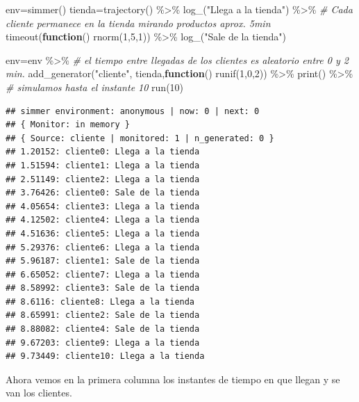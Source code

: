 \documentclass[
]{book}
\newenvironment{Shaded}{\begin{snugshade}}{\end{snugshade}}
\newcommand{\CommentTok}[1]{\textcolor[rgb]{0.56,0.35,0.01}{\textit{#1}}}
\newcommand{\ControlFlowTok}[1]{\textcolor[rgb]{0.13,0.29,0.53}{\textbf{#1}}}
\newcommand{\DecValTok}[1]{\textcolor[rgb]{0.00,0.00,0.81}{#1}}
\newcommand{\FunctionTok}[1]{\textcolor[rgb]{0.00,0.00,0.00}{#1}}
\newcommand{\NormalTok}[1]{#1}
\newcommand{\OtherTok}[1]{\textcolor[rgb]{0.56,0.35,0.01}{#1}}
\newcommand{\SpecialCharTok}[1]{\textcolor[rgb]{0.00,0.00,0.00}{#1}}
\newcommand{\StringTok}[1]{\textcolor[rgb]{0.31,0.60,0.02}{#1}}
\theoremstyle{definition}
\theoremstyle{definition}
\theoremstyle{definition}
\theoremstyle{definition}
\theoremstyle{remark}
\begin{document}
\begin{Shaded}
\begin{Highlighting}[]
\NormalTok{env}\OtherTok{=}\FunctionTok{simmer}\NormalTok{()}
\NormalTok{tienda}\OtherTok{=}\FunctionTok{trajectory}\NormalTok{() }\SpecialCharTok{\%\textgreater{}\%}
  \FunctionTok{log\_}\NormalTok{(}\StringTok{"Llega a la tienda"}\NormalTok{) }\SpecialCharTok{\%\textgreater{}\%}
  \CommentTok{\# Cada cliente permanece en la tienda mirando productos aprox. 5min}
  \FunctionTok{timeout}\NormalTok{(}\ControlFlowTok{function}\NormalTok{() }\FunctionTok{rnorm}\NormalTok{(}\DecValTok{1}\NormalTok{,}\DecValTok{5}\NormalTok{,}\DecValTok{1}\NormalTok{)) }\SpecialCharTok{\%\textgreater{}\%} 
  \FunctionTok{log\_}\NormalTok{(}\StringTok{"Sale de la tienda"}\NormalTok{)}

\NormalTok{env}\OtherTok{=}\NormalTok{env }\SpecialCharTok{\%\textgreater{}\%}
  \CommentTok{\# el tiempo entre llegadas de los clientes es aleatorio entre 0 y 2 min.}
  \FunctionTok{add\_generator}\NormalTok{(}\StringTok{"cliente"}\NormalTok{, tienda,}\ControlFlowTok{function}\NormalTok{() }\FunctionTok{runif}\NormalTok{(}\DecValTok{1}\NormalTok{,}\DecValTok{0}\NormalTok{,}\DecValTok{2}\NormalTok{)) }\SpecialCharTok{\%\textgreater{}\%} 
  \FunctionTok{print}\NormalTok{() }\SpecialCharTok{\%\textgreater{}\%}
  \CommentTok{\# simulamos hasta el instante 10}
  \FunctionTok{run}\NormalTok{(}\DecValTok{10}\NormalTok{) }
\end{Highlighting}
\end{Shaded}

\begin{verbatim}
## simmer environment: anonymous | now: 0 | next: 0
## { Monitor: in memory }
## { Source: cliente | monitored: 1 | n_generated: 0 }
## 1.20152: cliente0: Llega a la tienda
## 1.51594: cliente1: Llega a la tienda
## 2.51149: cliente2: Llega a la tienda
## 3.76426: cliente0: Sale de la tienda
## 4.05654: cliente3: Llega a la tienda
## 4.12502: cliente4: Llega a la tienda
## 4.51636: cliente5: Llega a la tienda
## 5.29376: cliente6: Llega a la tienda
## 5.96187: cliente1: Sale de la tienda
## 6.65052: cliente7: Llega a la tienda
## 8.58992: cliente3: Sale de la tienda
## 8.6116: cliente8: Llega a la tienda
## 8.65991: cliente2: Sale de la tienda
## 8.88082: cliente4: Sale de la tienda
## 9.67203: cliente9: Llega a la tienda
## 9.73449: cliente10: Llega a la tienda
\end{verbatim}

Ahora vemos en la primera columna los instantes de tiempo en que llegan y se van los clientes.
\end{document}
